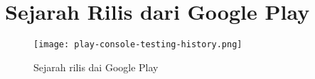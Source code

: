 \chapter{Sejarah Rilis dari Google Play}
\label{lamp:C}

\def\scl{1}
\def\leg{} 
\def\std{none}
\def\ymin{}
\def\ymax{}


\begin{figure}[H]
\centering
\texttt{[image: play-console-testing-history.png]}
\caption{Sejarah rilis dai Google Play}
\end{figure}